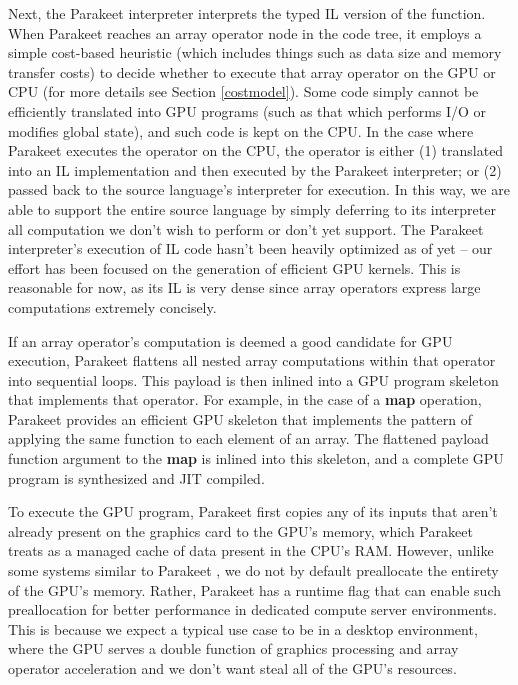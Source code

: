 \documentclass[preprint]{sigplanconf}
\begin{document}
Next, the Parakeet interpreter interprets the typed IL version of the function.  When Parakeet reaches an array operator node in the code tree, it employs a simple cost-based heuristic (which includes things such as data size and memory transfer costs) to decide whether to execute that array operator on the GPU or CPU (for more details see Section \ref{costmodel}).  Some code simply cannot be efficiently translated into GPU programs (such as that which performs I/O or modifies global state), and such code is kept on the CPU. In the case where Parakeet executes the operator on the CPU, the operator is either (1) translated into an IL implementation and then executed by the Parakeet interpreter; or (2) passed back to the source language's interpreter for execution. In this way, we are able to support the entire source language by simply deferring to its interpreter all computation we don't wish to perform or don't yet support. The Parakeet interpreter's execution of IL code hasn't been heavily optimized as of yet -- our effort has been focused on the generation of efficient GPU kernels.  This is reasonable for now, as its IL is very dense since array operators express large computations extremely concisely.

If an array operator's computation is deemed a good candidate for GPU execution, Parakeet flattens all nested array computations within that operator into sequential loops.  This payload is then inlined into a GPU program skeleton that implements that operator.  For example, in the case of a \textbf{map} operation, Parakeet provides an efficient GPU skeleton that implements the pattern of applying the same function to each element of an array.  The flattened payload function argument to the \textbf{map} is inlined into this skeleton, and a complete GPU program is synthesized and JIT compiled.

To execute the GPU program, Parakeet first copies any of its inputs that aren't already present on the graphics card to the GPU's memory, which Parakeet treats as a managed cache of data present in the CPU's RAM.  However, unlike some systems similar to Parakeet \cite{Chaf11}, we do not by default preallocate the entirety of the GPU's memory.  Rather, Parakeet has a runtime flag that can enable such preallocation for better performance in dedicated compute server environments.  This is because we expect a typical use case to be in a desktop environment, where the GPU serves a double function of graphics processing and array operator acceleration and we don't want steal all of the GPU's resources.
\end{document}
